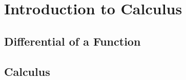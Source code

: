 \documentclass[10pt]{beamer}
\begin{document}
\section{Introduction to Calculus}
\subsection{Differential of a Function}


\subsection{Calculus}




{\1
\begin{frame}
\end{frame}}
\end{document}

